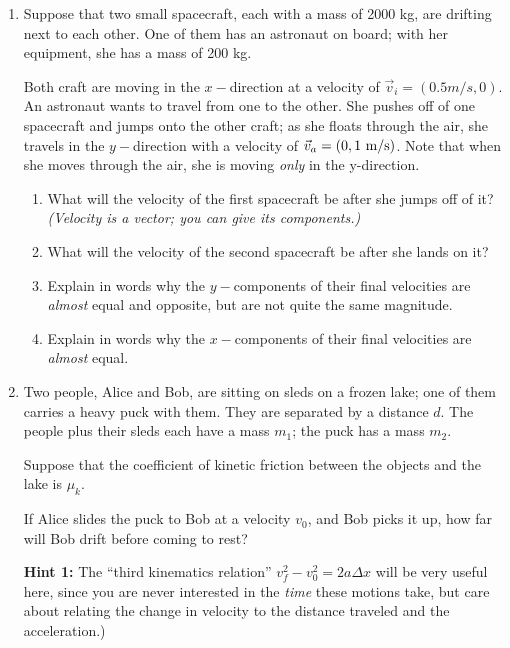 \documentclass[12pt]{article}
\begin{document}
\begin{enumerate}
\item Suppose that two small spacecraft, each with a mass of 2000 kg, are drifting next to each other. One of them has an astronaut on board; with her equipment, she has a mass of 200 kg. 

	Both craft are moving in the $x-$direction at a velocity of $\vec v_i = (0.5 m/s, 0)$. An astronaut wants to travel from one to the other. She pushes off of one spacecraft and jumps onto the other craft; as she floats through the air, she travels in the $y-$direction with a velocity of $\vec v_a = (0, 1~\rm m/\rm s)$. Note that when she moves through the air, she is moving {\it only} in the y-direction.


		\begin{enumerate}
			\item What will the velocity of the first spacecraft be after she jumps off of it? {\it (Velocity is a vector; you can give its components.)}
			
			\vspace{2.5in}
			
			\item What will the velocity of the second spacecraft be after she lands on it?
			
			\newpage
			
			\item Explain in words why the $y-$components of their final velocities are {\it almost} equal and opposite, but are not quite the same magnitude.
			
			\vspace{3in}
			
			\item Explain in words why the $x-$components of their final velocities are {\it almost} equal. 
		\end{enumerate}

\newpage

\item Two people, Alice and Bob, are sitting on sleds on a frozen lake; one of them carries a heavy puck with them. They are separated by a distance $d$. The people plus their sleds each have a mass $m_1$; the puck has a mass $m_2$.

	Suppose that the coefficient of kinetic friction between the objects and the lake is $\mu_k$.

	If Alice slides the puck to Bob at a velocity $v_0$, and Bob picks it up, how far will Bob drift before coming to rest?

		{\bf Hint 1:} The ``third kinematics relation'' $v_f^2 - v_0^2 = 2a\Delta x$ will be very useful here, since you are never interested in the {\it time} these motions take, but care about relating the change in velocity to the distance traveled and the acceleration.)


\end{enumerate}
\end{document}
